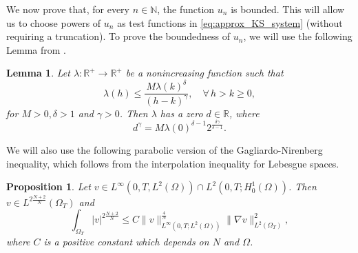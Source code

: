 \documentclass{amsart}
\numberwithin{equation}{section}
\newtheorem{lemma}[example]{Lemma}
\newtheorem{prop}[example]{Proposition}
\def\elle#1{L^{#1}}
\def\elleom#1{L^{#1}(\Omega)}
\def\Hom{H^1_0(\Omega)}
\def\ioT{\int_{\Omega_T}}
\def\norma#1#2{ \|#1 \|_{#2}}
\def\N{\mathbb{N}}
\def\R{\mathbb{R}}
\newcommand{\abs}[1]{\left|#1\right|}
\begin{document}
We now prove that, for every $n\in\N$, the function $u_n$ is bounded. This will allow us to choose powers of $u_n$ as test functions in \eqref{eq:approx_KS_system} (without requiring a truncation). To prove the boundedness of $u_n$, we will use the following Lemma from \cite{StampacchiaElliptic}.

\begin{lemma}\label{LemmaStampacchiaLinfty}
    Let $\lambda: \mathbb{R}^{+} \rightarrow \mathbb{R}^{+}$ be a nonincreasing function such that
    $$
    \lambda(h) \leq \frac{M \lambda(k)^\delta}{(h-k)^\gamma}, \quad \forall\, h>k \geq 0,
    $$
    for $M>0, \delta>1$ and $\gamma>0$. Then $\lambda$ has a zero $d\in\R$, where
    $$
    d^\gamma=M \lambda(0)^{\delta-1} 2^{\frac{\delta \gamma}{\delta-1}} .
    $$
\end{lemma}

We will also use the following parabolic version of the Gagliardo-Nirenberg inequality, which follows from the interpolation inequality for Lebesgue spaces.

\begin{prop}\label{GNSparabTheo}
    Let $v\in\elle\infty(0,T,\elleom2)\cap\elle2(0,T;\Hom)$. Then $v\in\elle{2\frac{N+2}{N}}(\Omega_T)$  and
    \begin{equation}\label{GNSparabEQ}
        \ioT \abs{v}^{2\frac{N+2}{N}}
        \leq C
        \norma{v}{\elle\infty(0,T;\elleom2)}^\frac{4}{N}\norma{\nabla v}{\elle2(\Omega_T)}^2,      
    \end{equation}
    where $C$ is a positive constant which depends on $N$ and $\Omega$.
\end{prop}
\end{document}
